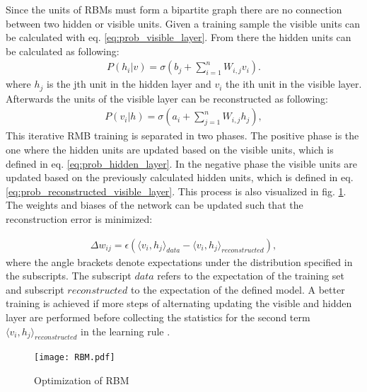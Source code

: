 Since the units of RBMs must form a bipartite graph there are no connection between two hidden or visible units. Given a training sample the visible units can be calculated with eq. \ref{eq:prob_visible_layer}. From there the hidden units can be calculated as following:
\begin{equation}
\begin{aligned}
    P(h_{i}|v) = \sigma(b_{j} + \sum_{i=1}^{n} W_{i,j} v_{i}).
    \label{eq:prob_hidden_layer}
\end{aligned}
\end{equation}
where $h_{j}$ is the jth unit in the hidden layer and $v_{i}$ the ith unit in the visible layer. Afterwards the units of the visible layer can be reconstructed as following:
\begin{equation}
\begin{aligned}
    P(v_{i}|h) = \sigma(a_{i} + \sum_{j=1}^{n} W_{i,j} h_{j}),
    \label{eq:prob_reconstructed_visible_layer}
\end{aligned}
\end{equation}
This iterative RMB training is separated in two phases. The positive phase is the one where the hidden units are updated based on the visible units, which is defined in eq. \ref{eq:prob_hidden_layer}. In the negative phase the visible units are updated based on the previously calculated hidden units, which is defined in eq. \ref{eq:prob_reconstructed_visible_layer}. This process is also visualized in fig. \ref{fig:RBM}. The weights and biases of the network can be updated such that the reconstruction error is minimized:

\begin{equation}
\begin{aligned}
    \Delta w_{ij} = \epsilon(\langle v_{i}, h_{j}\rangle_{data}- \langle v_{i}, h_{j}\rangle_{reconstructed}), 
    \label{eq:RBM_weight_update}
\end{aligned}
\end{equation}
where the angle brackets denote expectations under the distribution specified in the subscripts. The subscript $data$ refers to the expectation of the training set and subscript $reconstructed$ to the expectation of the defined model. A better training is achieved if more steps of alternating updating the visible and hidden layer are performed before collecting the statistics for the second term $\langle v_{i}, h_{j}\rangle_{reconstructed}$ in the learning rule \cite{Hinton2010}.

\begin{figure}[H]
  \centering
  \texttt{[image: RBM.pdf]}
  \caption {Optimization of RBM} \label{fig:RBM}
\end{figure}


